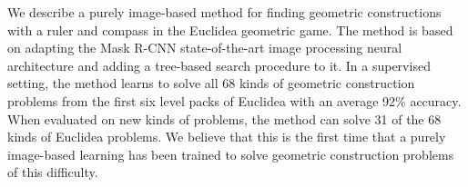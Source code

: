 \documentclass[12pt]{report}
\def\Abstract{
We describe a purely image-based method for finding geometric
constructions with a ruler and compass in the Euclidea geometric game.
The method is based on adapting the Mask R-CNN state-of-the-art image
processing neural architecture and adding a tree-based search
procedure to it.  In a supervised setting, the method learns to solve
all 68 kinds of geometric construction problems from the first six
level packs of Euclidea with an average 92\% accuracy. When evaluated
on new kinds of problems, the method can solve 31 of the 68 kinds of
Euclidea problems. We believe that this is the first time that a purely image-based learning has been trained to solve geometric construction problems of this difficulty.
}
\begin{document}
\Abstract
\end{document}
